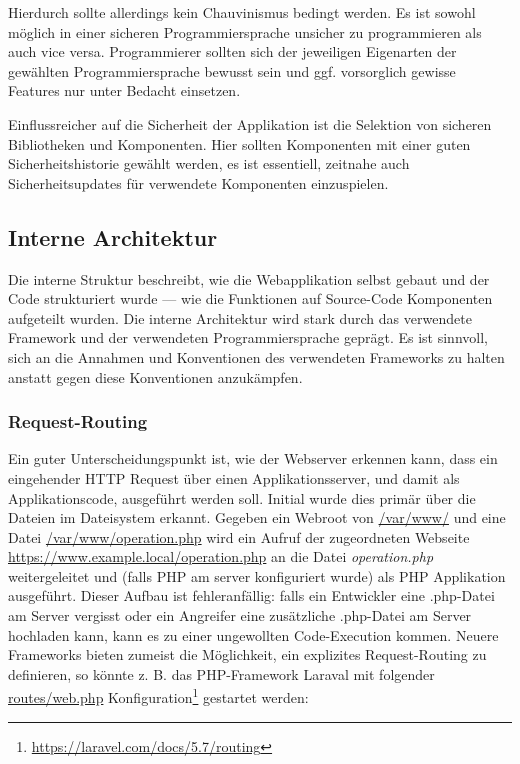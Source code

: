 Hierdurch sollte allerdings kein Chauvinismus bedingt werden. Es ist sowohl möglich in einer sicheren Programmiersprache unsicher zu programmieren als auch vice versa. Programmierer sollten sich der jeweiligen Eigenarten der gewählten Programmiersprache bewusst sein und ggf. vorsorglich gewisse Features nur unter Bedacht einsetzen.

Einflussreicher auf die Sicherheit der Applikation ist die Selektion von sicheren Bibliotheken und Komponenten. Hier sollten Komponenten mit einer guten Sicherheitshistorie gewählt werden, es ist essentiell, zeitnahe auch Sicherheitsupdates für verwendete Komponenten einzuspielen.

\subsection{Interne Architektur}

Die interne Struktur beschreibt, wie die Webapplikation selbst gebaut und der Code strukturiert wurde --- wie die Funktionen auf Source-Code Komponenten aufgeteilt wurden. Die interne Architektur wird stark durch das verwendete Framework und der verwendeten Programmiersprache geprägt. Es ist sinnvoll, sich an die Annahmen und Konventionen des verwendeten Frameworks zu halten anstatt gegen diese Konventionen anzukämpfen.

\subsubsection{Request-Routing}

Ein guter Unterscheidungspunkt ist, wie der Webserver erkennen kann, dass ein eingehender HTTP Request über einen Applikationsserver, und damit als Applikationscode, ausgeführt werden soll. Initial wurde dies primär über die Dateien im Dateisystem erkannt. Gegeben ein Webroot von \url{/var/www/} und eine Datei \url{/var/www/operation.php} wird ein Aufruf der zugeordneten Webseite \url{https://www.example.local/operation.php} an die Datei \textit{operation.php} weitergeleitet und (falls PHP am server konfiguriert wurde) als PHP Applikation ausgeführt. Dieser Aufbau ist fehleranfällig: falls ein Entwickler eine .php-Datei am Server vergisst oder ein Angreifer eine zusätzliche .php-Datei am Server hochladen kann, kann es zu einer ungewollten Code-Execution kommen. Neuere Frameworks bieten zumeist die Möglichkeit, ein explizites Request-Routing zu definieren, so könnte z. B. das PHP-Framework Laraval mit folgender \url{routes/web.php} Konfiguration\footnote{\url{https://laravel.com/docs/5.7/routing}} gestartet werden:

